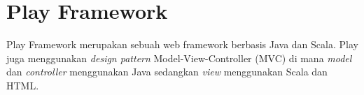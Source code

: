\section{Play Framework}
\label{sec:play}

Play Framework \cite{Leroux:2014} merupakan sebuah web framework berbasis Java dan Scala. Play juga menggunakan \textit{design pattern} Model-View-Controller (MVC) di mana \textit{model} dan \textit{controller} menggunakan Java sedangkan \textit{view} menggunakan Scala dan HTML. 
